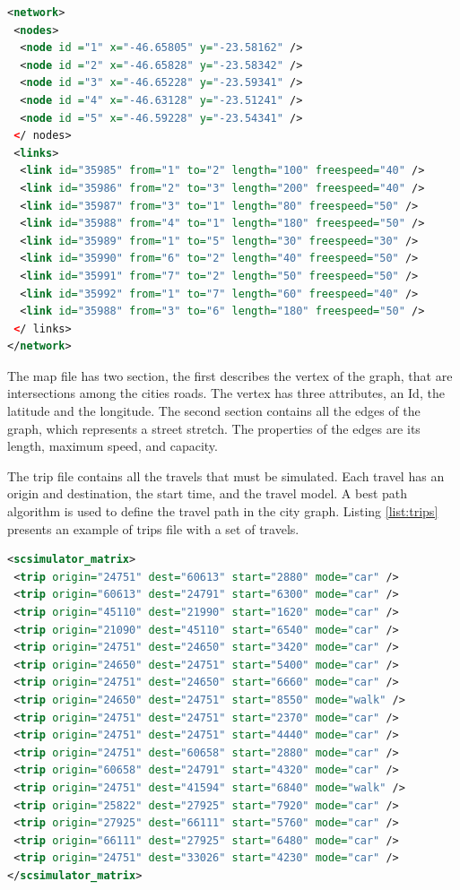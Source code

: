 \renewcommand{\thelstlisting}{\arabic{lstlisting}}
\lstset{language=XML}
\begin{lstlisting}[language=XML, caption=File describing the city road network, label=list:city, upquote=true]
<network>
 <nodes>
  <node id ="1" x="-46.65805" y="-23.58162" />
  <node id ="2" x="-46.65828" y="-23.58342" />
  <node id ="3" x="-46.65228" y="-23.59341" />
  <node id ="4" x="-46.63128" y="-23.51241" />
  <node id ="5" x="-46.59228" y="-23.54341" />
 </ nodes>
 <links>
  <link id="35985" from="1" to="2" length="100" freespeed="40" />
  <link id="35986" from="2" to="3" length="200" freespeed="40" />
  <link id="35987" from="3" to="1" length="80" freespeed="50" />
  <link id="35988" from="4" to="1" length="180" freespeed="50" />
  <link id="35989" from="1" to="5" length="30" freespeed="30" />
  <link id="35990" from="6" to="2" length="40" freespeed="50" />
  <link id="35991" from="7" to="2" length="50" freespeed="50" />
  <link id="35992" from="1" to="7" length="60" freespeed="40" />
  <link id="35988" from="3" to="6" length="180" freespeed="50" />
 </ links>
</network>
\end{lstlisting}

The map file has two section, the first describes the vertex of the graph, that are intersections among the cities roads. The vertex has three attributes, an Id, the latitude and the longitude. The second section contains all the edges of the graph, which represents a street stretch. The properties of the edges are its length, maximum speed, and capacity.

The trip file contains all the travels that must be simulated. Each travel has an origin and destination, the start time, and the travel model. A best path algorithm is used to define the travel path in the city graph. Listing  \ref{list:trips} presents an example of trips file with a set of travels.

\renewcommand{\thelstlisting}{\arabic{lstlisting}}
\lstset{language=XML}
\begin{lstlisting}[language=xml, caption=File containing the trips that will be simulated, label=list:trips, upquote=true]
<scsimulator_matrix>
 <trip origin="24751" dest="60613" start="2880" mode="car" />
 <trip origin="60613" dest="24791" start="6300" mode="car" />
 <trip origin="45110" dest="21990" start="1620" mode="car" />
 <trip origin="21090" dest="45110" start="6540" mode="car" />
 <trip origin="24751" dest="24650" start="3420" mode="car" />
 <trip origin="24650" dest="24751" start="5400" mode="car" />
 <trip origin="24751" dest="24650" start="6660" mode="car" />
 <trip origin="24650" dest="24751" start="8550" mode="walk" />
 <trip origin="24751" dest="24751" start="2370" mode="car" />
 <trip origin="24751" dest="24751" start="4440" mode="car" />
 <trip origin="24751" dest="60658" start="2880" mode="car" />
 <trip origin="60658" dest="24791" start="4320" mode="car" />
 <trip origin="24751" dest="41594" start="6840" mode="walk" />
 <trip origin="25822" dest="27925" start="7920" mode="car" />
 <trip origin="27925" dest="66111" start="5760" mode="car" />
 <trip origin="66111" dest="27925" start="6480" mode="car" />
 <trip origin="24751" dest="33026" start="4230" mode="car" />
</scsimulator_matrix>
\end{lstlisting}

